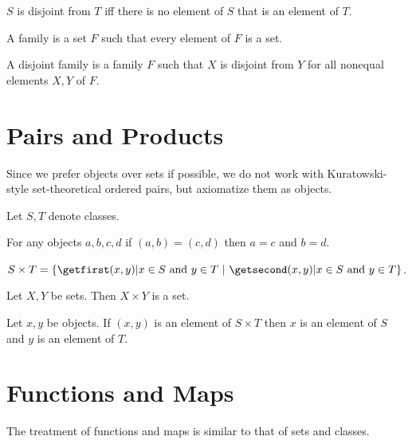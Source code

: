 \documentclass[english,11pt]{article}
\begin{document}
\begin{forthel}
  \begin{definition}
    $S$ is disjoint from $T$ iff there is no element of $S$ that is an element
    of $T$.
  \end{definition}

  \begin{definition}
    A family is a set $F$ such that every element of $F$ is a set.
  \end{definition}

  \begin{definition}
    A disjoint family is a family $F$ such that $X$ is disjoint from $Y$ for all
    nonequal elements $X, Y$ of $F$.
  \end{definition}
\end{forthel}


\section{Pairs and Products}

Since we prefer objects over sets if possible, we do not work
with Kuratowski-style set-theoretical ordered pairs, but
axiomatize them as objects.

\begin{forthel}
  Let $S, T$ denote classes.

  \begin{axiom}
    For any objects $a, b, c, d$ if $(a,b) = (c,d)$ then $a = c$ and $b = d$.
  \end{axiom}

  \begin{definition}
    $S \times T = \class{(x,y) | \text{$x \in S$ and $y \in T$}}$.
  \end{definition}

  \begin{axiom}
    Let $X, Y$ be sets.
    Then $X \times Y$ is a set.
  \end{axiom}

  \begin{lemma}
    Let $x, y$ be objects.
    If $(x,y)$ is an element of $S \times T$ then $x$ is an element of $S$ and
    $y$ is an element of $T$.
  \end{lemma}
\end{forthel}


\section{Functions and Maps}

The treatment of functions and maps is similar to that
of sets and classes.
\end{document}
